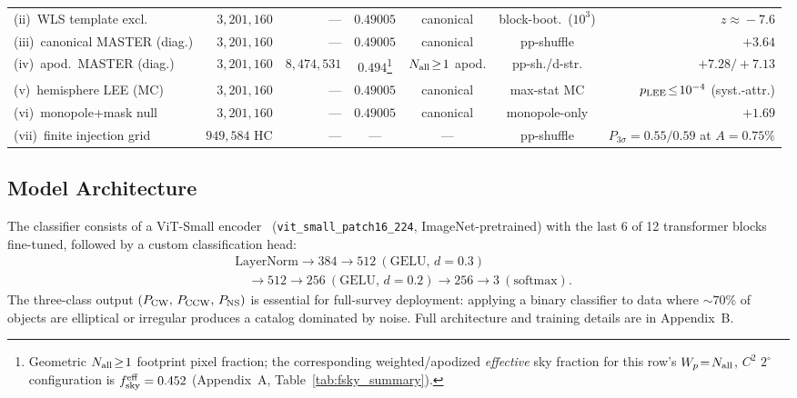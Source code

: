 \documentclass[aps,prd,twocolumn,superscriptaddress,preprintnumbers,nofootinbib,longbibliography,floatfix]{revtex4-2}
\newcommand{\pcw}{P_{\rm CW}}
\newcommand{\pccw}{P_{\rm CCW}}
\newcommand{\pns}{P_{\rm NS}}
\newcommand{\vit}{ViT-Small}
\begin{document}
\begin{table}[t]
\begin{ruledtabular}
\begin{tabular}{lrrcccr}
(ii)~WLS template excl. & $3{,}201{,}160$ & --- & $0.49005$ & canonical & block-boot.\ ($10^3$) & $z\!\approx\!-7.6$ \\
(iii)~canonical MASTER (diag.) & $3{,}201{,}160$ & --- & $0.49005$ & canonical & pp-shuffle & $+3.64$ \\
(iv)~apod.\ MASTER (diag.) & $3{,}201{,}160$ & $8{,}474{,}531$ & $0.494$\footnote{Geometric $N_{\rm all}\!\ge\!1$ footprint pixel fraction; the corresponding weighted/apodized \emph{effective} sky fraction for this row's $W_p\!=\!N_{\rm all}$, $C^2$ $2^\circ$ configuration is $f_{\rm sky}^{\rm eff}=0.452$ (Appendix~A, Table~\ref{tab:fsky_summary}).} & $N_{\rm all}\!\geq\!1$ apod. & pp-sh./d-str. & $+7.28/{+}7.13$ \\
(v)~hemisphere LEE (MC) & $3{,}201{,}160$ & --- & $0.49005$ & canonical & max-stat MC & $p_{\rm LEE}\!\le\!10^{-4}$ (syst.-attr.) \\
(vi)~monopole+mask null & $3{,}201{,}160$ & --- & $0.49005$ & canonical & monopole-only & $+1.69$ \\
(vii)~finite injection grid & $949{,}584$ HC & --- & --- & --- & pp-shuffle & $P_{3\sigma}=0.55/0.59$ at $A\!=\!0.75\%$ \\
\end{tabular}
\end{ruledtabular}
\end{table}

\subsection{Model Architecture}
\label{sec:architecture}

The classifier consists of a \vit{} encoder~\cite{Dosovitskiy:2020} (\texttt{vit\_small\_patch16\_224}, ImageNet-pretrained) with the last 6 of 12 transformer blocks fine-tuned, followed by a custom classification head:
\begin{equation}
\begin{aligned}
&\text{LayerNorm} \to 384{\to}512~(\text{GELU},\,d{=}0.3) \\
&\quad \to 512{\to}256~(\text{GELU},\,d{=}0.2) \to 256{\to}3~(\text{softmax}).
\end{aligned}
\end{equation}
The three-class output $(\pcw,\,\pccw,\,\pns)$ is essential for full-survey deployment: applying a binary classifier to data where $\sim\!70\%$ of objects are elliptical or irregular produces a catalog dominated by noise. Full architecture and training details are in Appendix~B.
\end{document}
